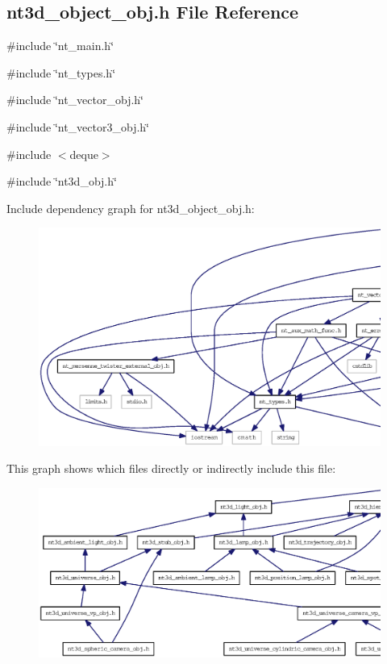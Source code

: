 \subsection{nt3d\_\-object\_\-obj.h File Reference}
\label{nt3d__object__obj_8h}
{\ttfamily \#include \char`\"{}nt\_\-main.h\char`\"{}}\par
{\ttfamily \#include \char`\"{}nt\_\-types.h\char`\"{}}\par
{\ttfamily \#include \char`\"{}nt\_\-vector\_\-obj.h\char`\"{}}\par
{\ttfamily \#include \char`\"{}nt\_\-vector3\_\-obj.h\char`\"{}}\par
{\ttfamily \#include $<$deque$>$}\par
{\ttfamily \#include \char`\"{}nt3d\_\-obj.h\char`\"{}}\par
Include dependency graph for nt3d\_\-object\_\-obj.h:
\nopagebreak
\begin{figure}[H]
\begin{center}
\leavevmode
\includegraphics[width=400pt]{nt3d__object__obj_8h__incl}
\end{center}
\end{figure}
This graph shows which files directly or indirectly include this file:
\nopagebreak
\begin{figure}[H]
\begin{center}
\leavevmode
\includegraphics[width=400pt]{nt3d__object__obj_8h__dep__incl}
\end{center}
\end{figure}
